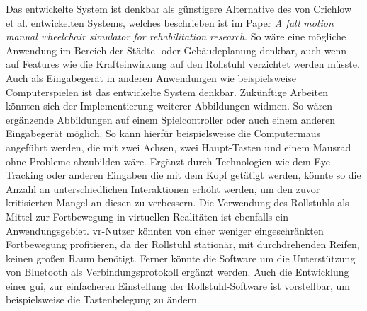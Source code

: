Das entwickelte System ist denkbar als günstigere Alternative des von Crichlow et al. entwickelten Systems, welches beschrieben ist im Paper \textit{A full motion manual wheelchair simulator for rehabilitation research}\cite{crichlowFullMotionManual2011}.
So wäre eine mögliche Anwendung im Bereich der Städte- oder Gebäudeplanung denkbar, auch wenn auf Features wie die Krafteinwirkung auf den Rollstuhl verzichtet werden müsste.
Auch als Eingabegerät in anderen Anwendungen wie beispielsweise Computerspielen ist das entwickelte System denkbar.
Zukünftige Arbeiten könnten sich der Implementierung weiterer Abbildungen widmen.
So wären ergänzende Abbildungen auf einem Spielcontroller oder auch einem anderen Eingabegerät möglich.
So kann hierfür beispielsweise die Computermaus angeführt werden, die mit zwei Achsen, zwei Haupt-Tasten und einem Mausrad ohne Probleme abzubilden wäre.
Ergänzt durch Technologien wie dem Eye-Tracking oder anderen Eingaben die mit dem Kopf getätigt werden, könnte so die Anzahl an unterschiedlichen Interaktionen erhöht werden, um den zuvor kritisierten Mangel an diesen zu verbessern.
Die Verwendung des Rollstuhls als Mittel zur Fortbewegung in virtuellen Realitäten ist ebenfalls ein Anwendungsgebiet.
\ac{vr}-Nutzer könnten von einer weniger eingeschränkten Fortbewegung profitieren, da der Rollstuhl stationär, mit durchdrehenden Reifen, keinen großen Raum benötigt.
Ferner könnte die Software um die Unterstützung von Bluetooth als Verbindungsprotokoll ergänzt werden.
Auch die Entwicklung einer \ac{gui}, zur einfacheren Einstellung der Rollstuhl-Software ist vorstellbar, um beispielsweise die Tastenbelegung zu ändern.